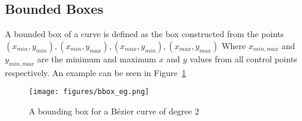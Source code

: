 \subsection{Bounded Boxes}
\label{subsec:back_boundedboxes}

  A bounded box of a curve is defined as the box constructed from the points $(x_{min},y_{min}), (x_{min},y_{max}), (x_{max},y_{min}), (x_{max},y_{max})$ Where $x_{min,max}$ and $y_{min,max}$ are the minimum and maximum $x$ and $y$ values from all control points respectively. An example can be seen in Figure~\ref{fig:bboxeg}

 \begin{figure}[ht]
   \centering
   \texttt{[image: figures/bbox\_eg.png]}
   \caption{\label{fig:bboxeg} A bounding box for a Bézier curve of degree 2}
 \end{figure}



